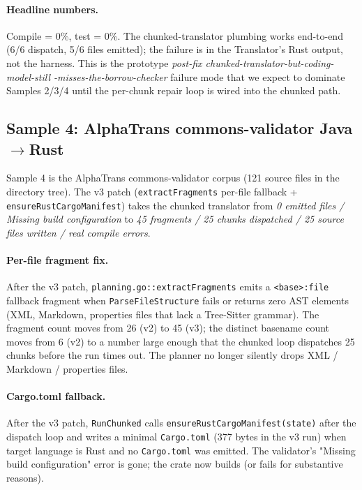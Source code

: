 \paragraph{Headline numbers.}
Compile = 0\%, test = 0\%. The chunked-translator plumbing works
end-to-end (6/6 dispatch, 5/6 files emitted); the failure is in
the Translator's Rust output, not the harness. This is the
prototype \emph{post-fix chunked-translator-but-coding-model-still
-misses-the-borrow-checker} failure mode that we expect to dominate
Samples 2/3/4 until the per-chunk repair loop is wired into the
chunked path.

\subsection{Sample 4: AlphaTrans commons-validator Java$\rightarrow$Rust}

Sample 4 is the AlphaTrans commons-validator corpus (121 source
files in the directory tree). The v3 patch (\texttt{extractFragments}
per-file fallback + \texttt{ensureRustCargoManifest}) takes the
chunked translator from \emph{0 emitted files / Missing build
configuration} to \emph{45 fragments / 25 chunks dispatched / 25
source files written / real compile errors}.

\paragraph{Per-file fragment fix.}
After the v3 patch, \texttt{planning.go::extractFragments} emits a
\texttt{<base>:file} fallback fragment when
\texttt{ParseFileStructure} fails or returns zero AST elements
(XML, Markdown, properties files that lack a Tree-Sitter grammar).
The fragment count moves from 26 (v2) to 45 (v3); the distinct
basename count moves from 6 (v2) to a number large enough that the
chunked loop dispatches 25 chunks before the run times out. The
planner no longer silently drops XML / Markdown / properties files.

\paragraph{Cargo.toml fallback.}
After the v3 patch, \texttt{RunChunked} calls
\texttt{ensureRustCargoManifest(state)} after the dispatch loop
and writes a minimal \texttt{Cargo.toml} (377 bytes in the v3 run)
when target language is Rust and no \texttt{Cargo.toml} was emitted.
The validator's "Missing build configuration" error is gone; the
crate now builds (or fails for substantive reasons).

